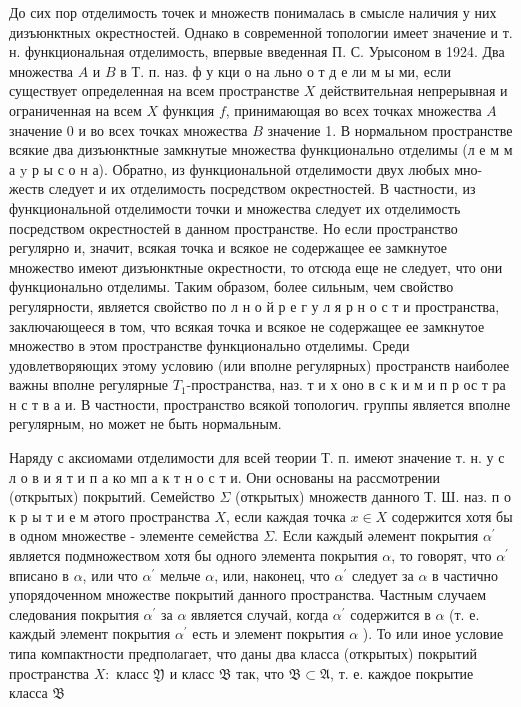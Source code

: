 \documentclass[10pt]{article}
\begin{document}
До сих пор отделимость точек и множеств понималась в смысле наличия у них дизъюнктных окрестностей. Однако в современной топологии имеет значение и т. н. функциональная отделимость, впервые введенная П. С. Урысоном в 1924. Два множества $A$ и $B$ в Т. п. наз. ф у кци о на льно о т д е ли м ы ми, если существует определенная на всем пространстве $X$ действительная непрерывная и ограниченная на всем $X$ функция $f$, принимающая во всех точках множества $A$ значение 0 и во всех точках множества $B$ значение 1. В нормальном пространстве всякие два дизъюнктные замкнутые множества функционально отделимы (л е м м а $\mathrm{y}$ р ы с о н а). Обратно, из функциональной отделимости двух любых мно- жеств следует и их отделимость посредством окрестностей. В частности, из функциональной отделимости точки и множества следует их отделимость посредством окрестностей в данном пространстве. Но если пространство регулярно и, значит, всякая точка и всякое не содержащее ее замкнутое множество имеют дизъюнктные окрестности, то отсюда еще не следует, что они функционально отделимы. Таким образом, более сильным, чем свойство регулярности, является свойство по л н о й р е г у л я р н о с т и пространства, заключающееся в том, что всякая точка и всякое не содержащее ее замкнутое множество в этом пространстве функционально отделимы. Среди удовлетворяющих этому условию (или вполне регулярных) пространств наиболее важны вполне регулярные $T_{1}$-пространства, наз. т и х оно в с к и м и п р ос т ра н с т в а и. В частности, пространство всякой топологич. группы является вполне регулярным, но может не быть нормальным.



Наряду с аксиомами отделимости для всей теории Т. п. имеют значение т. н. у с л о в и я т и п а ко мп а к т н о с т и. Они основаны на рассмотрении (открытых) покрытий. Семейство $\Sigma$ (открытых) множеств данного Т. Ш. наз. п о к р ы т и е м әтого пространства $X$, если каждая точка $x \in X$ содержится хотя бы в одном множестве - элементе семейства $\Sigma$. Если каждый әлемент покрытия $\alpha^{\prime}$ является подмножеством хотя бы одного элемента покрытия $\alpha$, то говорят, что $\alpha^{\prime}$ вписано в $\alpha$, или что $\alpha^{\prime}$ мельче $\alpha$, или, наконец, что $\alpha^{\prime}$ следует за $\alpha$ в частично упорядоченном множестве покрытий данного пространства. Частным случаем следования покрытия $\alpha^{\prime}$ за $\alpha$ является случай, когда $\alpha^{\prime}$ содержится в $\alpha$ (т. е. каждый элемент покрытия $\alpha^{\prime}$ есть и элемент покрытия $\alpha$ ). То или иное условие типа компактности предполагает, что даны два класса (открытых) покрытий пространства $X:$ класс $\mathfrak{Y}$ и класс $\mathfrak{B}$ так, что $\mathfrak{B} \subset \mathfrak{A}$, т. е. каждое покрытие класса $\mathfrak{B}$
\end{document}
